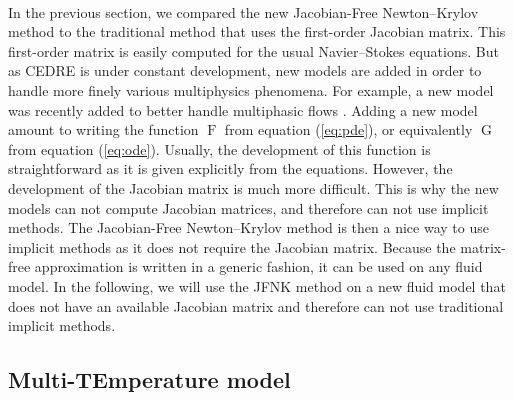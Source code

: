     \paragraph{}
    In the previous section, we compared the new Jacobian-Free Newton--Krylov method to the traditional method that uses the first-order Jacobian matrix.
    This first-order matrix is easily computed for the usual Navier--Stokes equations.
    But as CEDRE is under constant development, new models are added in order to handle more finely various multiphysics phenomena.
    For example, a new model was recently added to better handle multiphasic flows \cite{Cordesse2020}.
    Adding a new model amount to writing the function $\operatorname{F}$ from equation (\ref{eq:pde}), or equivalently $\operatorname{G}$ from equation (\ref{eq:ode}).
    Usually, the development of this function is straightforward as it is given explicitly from the equations.
    However, the development of the Jacobian matrix is much more difficult.
    This is why the new models can not compute Jacobian matrices, and therefore can not use implicit methods.
    The Jacobian-Free Newton--Krylov method is then a nice way to use implicit methods as it does not require the Jacobian matrix.
    Because the matrix-free approximation is written in a generic fashion, it can be used on any fluid model.
    In the following, we will use the JFNK method on a new fluid model that does not have an available Jacobian matrix and therefore can not use traditional implicit methods.


    \subsection{Multi-TEmperature model}

